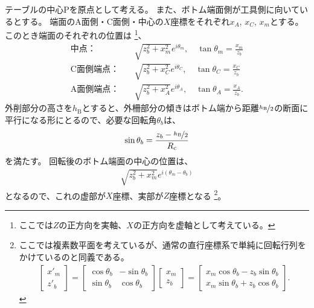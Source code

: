 \clearpage
テーブルの中心Pを原点として考える。
また、ボトム端面側が工具側に向いているとする。
端面のA面側・C面側・中心の$X$座標をそれぞれ$x_A$, $x_C$, $x_m$とする。
このとき端面のそれぞれの位置は
\footnote{ここでは$Z$の正方向を実軸、$X$の正方向を虚軸として考えている。}、
\begin{subequations}
\begin{align*}
  \text{中点：}&\quad \sqrt{z_b^2+x_m^2}e^{i\theta_m}, \quad \tan\theta_m = \frac{x_m}{z_b}\\
  \text{C面側端点：}&\quad \sqrt{z_b^2+x_C^2}e^{i\theta_C}, \quad \tan\theta_C = \frac{x_C}{z_b}\\
  \text{A面側端点：}&\quad \sqrt{z_b^2+x_A^2}e^{i\theta_A}, \quad \tan\theta_A = \frac{x_A}{z_b}.
\end{align*}
\end{subequations}
外削部分の高さを$h_\mathrm B$とすると、外柵部分の傾きはボトム端から距離$\nicefrac{h_\mathrm B}2$の断面に平行になる形にとるので、必要な回転角$\theta_b$は、
\begin{align*}
  \sin\theta_b = \frac{z_b-\nicefrac{h_\mathrm B}2}{R_\mathrm c}
\end{align*}
を満たす。
回転後のボトム端面の中心の位置は、
\begin{align*}
  \sqrt{z_b^2+x_m^2}e^{i(\theta_m-\theta_b)}
\end{align*}
となるので、これの虚部が$X$座標、実部が$Z$座標となる
\footnote{ここでは複素数平面を考えているが、通常の直行座標系で単純に回転行列をかけているのと同義である。
\begin{align*}
  \left[
    \begin{array}{c}
      x'_m\\
      z'_b
    \end{array}
  \right]
  = \left[
    \begin{array}{cc}
      \cos\theta_b & -\sin\theta_b\\
      \sin\theta_b & \cos\theta_b
    \end{array}
  \right]\!\!
  \left[
    \begin{array}{c}
      x_m\\
      z_b
    \end{array}
  \right]
  = \left[
    \begin{array}{c}
      x_m\cos\theta_b-z_b\sin\theta_b\\
      x_m\sin\theta_b+z_b\cos\theta_b
    \end{array}
  \right].
\end{align*}%
}。

